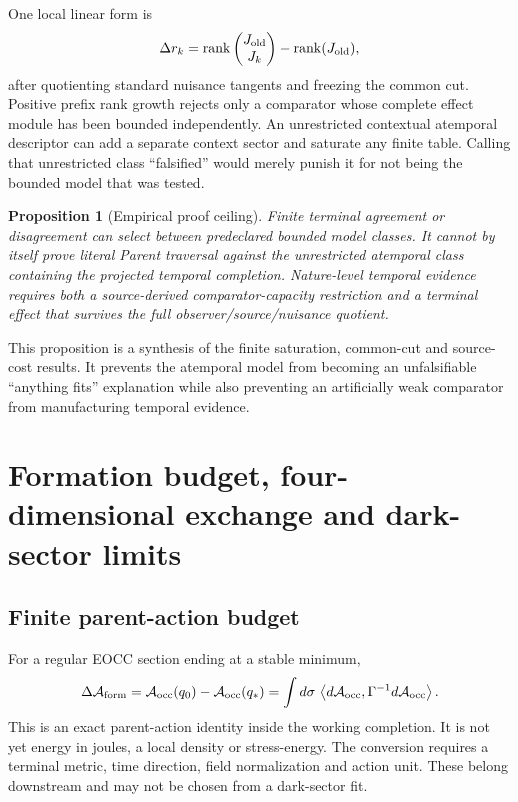 \documentclass[11pt]{article}
\newtheorem{proposition}{Proposition}
\newcommand{\rank}{\operatorname{rank}}
\begin{document}
One local linear form is
\begin{equation}
 \Delta r_k
 =\rank\begin{pmatrix}J_{\rm old}\\J_k\end{pmatrix}
  -\rank(J_{\rm old}),
 \label{eq:rank-innovation}
\end{equation}
after quotienting standard nuisance tangents and freezing the common cut.
Positive prefix rank growth rejects only a comparator whose complete effect
module has been bounded independently.  An unrestricted contextual
atemporal descriptor can add a separate context sector and saturate any finite
table.  Calling that unrestricted class ``falsified'' would merely punish it
for not being the bounded model that was tested.

\begin{proposition}[Empirical proof ceiling]
Finite terminal agreement or disagreement can select between predeclared
bounded model classes.  It cannot by itself prove literal Parent traversal
against the unrestricted atemporal class containing the projected temporal
completion.  Nature-level temporal evidence requires both a source-derived
comparator-capacity restriction and a terminal effect that survives the full
observer/source/nuisance quotient.
\end{proposition}

This proposition is a synthesis of the finite saturation, common-cut and
source-cost results.  It prevents the atemporal model from becoming an
unfalsifiable ``anything fits'' explanation while also preventing an
artificially weak comparator from manufacturing temporal evidence.

\section{Formation budget, four-dimensional exchange and dark-sector limits}

\subsection{Finite parent-action budget}

For a regular EOCC section ending at a stable minimum,
\begin{equation}
 \Delta\mathcal A_{\rm form}
 =\mathcal A_{\rm occ}(q_0)-\mathcal A_{\rm occ}(q_*)
 =\int d\sigma\,
 \left\langle d\mathcal A_{\rm occ},
 \Gamma^{-1}d\mathcal A_{\rm occ}\right\rangle.
 \label{eq:formation-budget}
\end{equation}
This is an exact parent-action identity inside the working completion.  It is
not yet energy in joules, a local density or stress-energy.  The conversion
requires a terminal metric, time direction, field normalization and action
unit.  These belong downstream and may not be chosen from a dark-sector fit.
\end{document}
